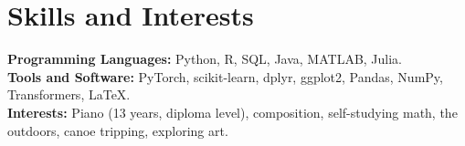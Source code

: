 \section{Skills and Interests}
\textbf{Programming Languages: } Python, R, SQL, Java, MATLAB, Julia. \\
\textbf{Tools and Software: } PyTorch, scikit-learn, dplyr, ggplot2, Pandas, NumPy, Transformers, \LaTeX. \\
\textbf{Interests: } Piano (13 years, diploma level), composition, self-studying math, the outdoors, canoe tripping, exploring art. 